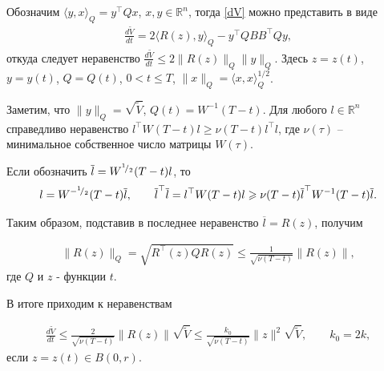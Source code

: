 \documentclass[../main.tex]{subfiles}
\begin{document}
	Обозначим $ \langle y, x \rangle_Q = y^{\top} Q x $, $ x,y \in \mathbb{R}^n $, тогда \eqref{dV}  можно представить в виде 
	\begin{gather*}
		\frac{d\widetilde{V}}{dt} = 2 \langle R(z),y\rangle_Q - y^{\top} Q BB^{\top} Q y,
	\end{gather*}
	откуда следует неравенство $
		\frac{d\widetilde{V}}{dt} \leqslant 2 \| R(z) \|_Q \| y\|_Q. $
	Здесь $ z = z(t) $, $ y = y(t) $, $Q = Q(t) $, $ 0 < t \leqslant T $, 
	$\| x \|_Q =\langle x,x\rangle_Q^{1/2}$.
	
	Заметим, что $\| y \|_Q  = \sqrt{\widetilde{V}}$,
	 $ Q(t) = W^{-1}(T - t)$. Для любого $ l\in \mathbb{R}^n $ справедливо неравенство $ l^{\top} W(T - t) l \geqslant \nu(T - t) l^{\top} l $, где $ \nu(\tau) $ -- минимальное собственное число матрицы $ W(\tau) $.
	
	Если обозначить $ \overline{l} = W^{{}^{1}\!/_{2}}(T - t)l $, то
	\begin{gather*}
		l = W^{-{}^{1}\!/_{2}}(T - t)\overline{l}, \qquad \overline{l}^{\top} \overline{l} = l^{\top} W(T - t) l 
		\geqslant \nu(T - t)  \overline{l}^{\top} W^{-1}(T - t)\overline{l}.
	\end{gather*}
	
	Таким образом, подставив в последнее неравенство $ \overline{l} = R(z) $, получим 
	
	\begin{gather*}
		\| R(z) \|_Q = \sqrt{R^{\top}(z) Q R(z)} \leqslant \frac{1}{\sqrt{\nu(T - t)}} \| R(z)\|,
	\end{gather*}
	где $ Q $ и $ z $ - функции $ t $.
	
	В итоге приходим к неравенствам
	
	\begin{gather*}
		\frac{d\widetilde{V}}{dt} \leqslant \frac{2}{\sqrt{\nu(T - t)}} \| R(z) \| \sqrt{\widetilde{V}} \leqslant \frac{k_0}{\sqrt{\nu(T - t)}} \|z\|^2 \sqrt{\widetilde{V}}, \qquad k_0 = 2k, 
	\end{gather*}
	если $ z=z(t) \in B(0,r) $.
	
\end{document}
